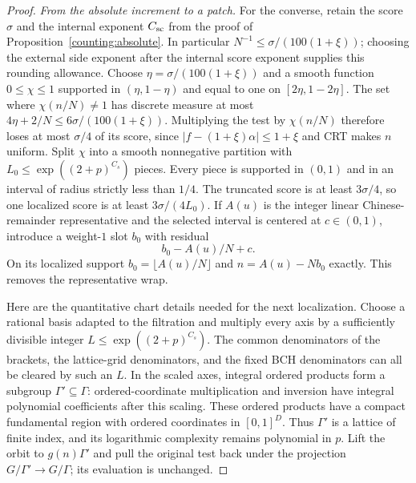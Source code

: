 \begin{proof}
\emph{From the absolute increment to a patch.}
For the converse, retain the score $\sigma$ and the internal exponent
$C_{\rm sc}$ from the proof of Proposition~\ref{counting:absolute}.
In particular $N^{-1}\leq\sigma/(100(1+\xi))$; choosing the external
side exponent after the internal score exponent supplies this rounding
allowance.
Choose $\eta=\sigma/(100(1+\xi))$ and a smooth function
$0\leq\chi\leq1$ supported in $(\eta,1-\eta)$ and equal to one
on $[2\eta,1-2\eta]$.  The set where $\chi(n/N)\ne1$ has discrete
measure at most $4\eta+2/N\leq6\sigma/(100(1+\xi))$.
Multiplying the test by $\chi(n/N)$ therefore loses at most
$\sigma/4$ of its score, since
$|f-(1+\xi)\alpha|\leq1+\xi$ and CRT makes $n$ uniform.
Split $\chi$ into a smooth nonnegative partition with
$L_0\leq\exp((2+p)^{C_s})$ pieces.  Every piece is supported in
$(0,1)$ and in an interval of radius strictly less than $1/4$.
The truncated score is at least $3\sigma/4$, so one localized score
is at least $3\sigma/(4L_0)$.  If $A(u)$ is the
integer linear Chinese-remainder representative and the selected
interval is centered at $c\in(0,1)$, introduce a weight-$1$ slot $b_0$
with residual
\[
 b_0-A(u)/N+c.
\]
On its localized support $b_0=\lfloor A(u)/N\rfloor$ and
$n=A(u)-Nb_0$ exactly.  This removes the representative wrap.

Here are the quantitative chart details needed for the next localization.
Choose a rational basis adapted to the filtration and multiply every
axis by a sufficiently divisible integer $L\leq\exp((2+p)^{C_s})$.
The common denominators of the brackets, the lattice-grid denominators,
and the fixed BCH denominators can all be cleared by such an $L$.
In the scaled axes, integral ordered products form a subgroup
$\Gamma'\subseteq\Gamma$: ordered-coordinate multiplication and
inversion have integral polynomial coefficients after this scaling.
These ordered products have a compact fundamental region with ordered
coordinates in $[0,1]^D$.  Thus $\Gamma'$ is a lattice of finite index,
and its logarithmic complexity remains polynomial in $p$.  Lift the
orbit to $g(n)\Gamma'$ and pull the original test back under the
projection $G/\Gamma'\to G/\Gamma$; its evaluation is unchanged.


\end{proof}
